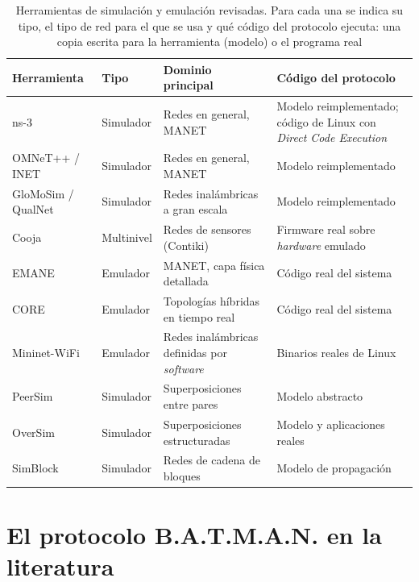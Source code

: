 \begin{table}[htbp!]
    \centering
    \caption{Herramientas de simulación y emulación revisadas. Para cada una se indica su tipo, el tipo de red para el que se usa y qué código del protocolo ejecuta: una copia escrita para la herramienta (modelo) o el programa real}
    \label{tab:comparativa-simuladores}
    \footnotesize
    \begin{tabular}{|p{2.6cm}|p{2.0cm}|p{3.4cm}|p{3.6cm}|}
        \hline
        \textbf{Herramienta} & \textbf{Tipo} & \textbf{Dominio principal} & \textbf{Código del protocolo} \\
        \hline
        ns-3 & Simulador & Redes en general, MANET & Modelo reimplementado; código de Linux con \textit{Direct Code Execution} \\
        \hline
        OMNeT++ / INET & Simulador & Redes en general, MANET & Modelo reimplementado \\
        \hline
        GloMoSim / QualNet & Simulador & Redes inalámbricas a gran escala & Modelo reimplementado \\
        \hline
        Cooja & Multinivel & Redes de sensores (Contiki) & Firmware real sobre \textit{hardware} emulado \\
        \hline
        EMANE & Emulador & MANET, capa física detallada & Código real del sistema \\
        \hline
        CORE & Emulador & Topologías híbridas en tiempo real & Código real del sistema \\
        \hline
        Mininet-WiFi & Emulador & Redes inalámbricas definidas por \textit{software} & Binarios reales de Linux \\
        \hline
        PeerSim & Simulador & Superposiciones entre pares & Modelo abstracto \\
        \hline
        OverSim & Simulador & Superposiciones estructuradas & Modelo y aplicaciones reales \\
        \hline
        SimBlock & Simulador & Redes de cadena de bloques & Modelo de propagación \\
        \hline
    \end{tabular}
\end{table}

\section{El protocolo B.A.T.M.A.N. en la literatura}
\label{sec:batman-literatura}

